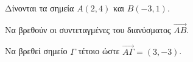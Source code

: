 Δίνονται τα σημεία $ A(2,4) $ και $ B(-3,1) $.
\begin{alist}
\item Να βρεθούν οι συντεταγμένες του διανύσματος $ \overrightarrow{AB} $.
\item Να βρεθεί σημείο $ \varGamma $ τέτοιο ώστε $ \overrightarrow{A\varGamma}=(3,-3) $.
\end{alist}
